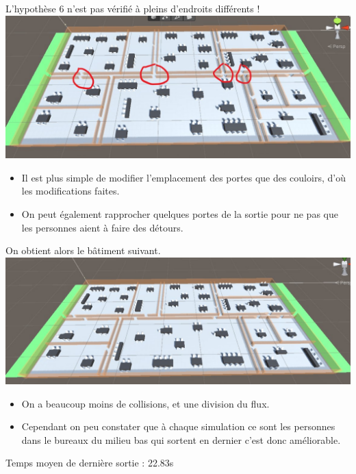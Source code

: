 \documentclass[12pt]{article}
\begin{document}
L'hypothèse 6 n'est pas vérifié à pleins d'endroits différents !
\newline
\includegraphics[scale=0.5]{Batiment problème 6..jpg}
\newline
\begin{itemize}
    \item Il est plus simple de modifier l'emplacement des portes que des couloirs, d'où les modifications faites.
    \item On peut également rapprocher quelques portes de la sortie pour ne pas que les personnes aient à faire des détours.
\end{itemize}
On obtient alors le bâtiment suivant.
\newline
\includegraphics[scale=0.5]{Batiment Hypothèse 6..jpg}
\newline
\begin{itemize}
    \item On a beaucoup moins de collisions, et une division du flux.
    \item Cependant on peu constater que à chaque simulation ce sont les personnes dans le bureaux du milieu bas qui sortent en dernier c'est donc améliorable.
\end{itemize}
Temps moyen de dernière sortie : 22.83s
\end{document}
